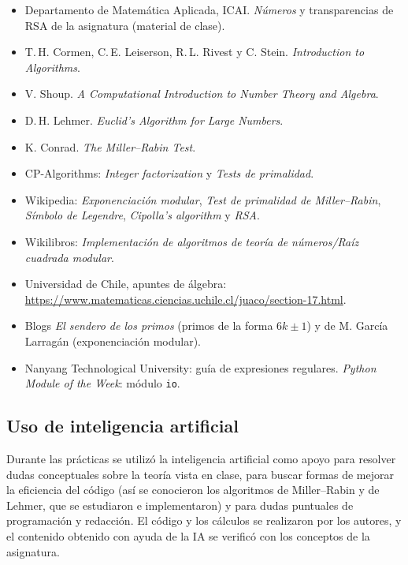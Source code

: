 \documentclass[11pt,a4paper]{article}
\newcommand{\code}[1]{\texttt{#1}}
\begin{document}
\begin{itemize}
\item Departamento de Matemática Aplicada, ICAI. \emph{Números} y transparencias de RSA de la asignatura (material de clase).
\item T.\,H. Cormen, C.\,E. Leiserson, R.\,L. Rivest y C. Stein. \emph{Introduction to Algorithms}.
\item V. Shoup. \emph{A Computational Introduction to Number Theory and Algebra}.
\item D.\,H. Lehmer. \emph{Euclid's Algorithm for Large Numbers}.
\item K. Conrad. \emph{The Miller--Rabin Test}.
\item CP-Algorithms: \emph{Integer factorization} y \emph{Tests de primalidad}.
\item Wikipedia: \emph{Exponenciación modular}, \emph{Test de primalidad de Miller--Rabin}, \emph{Símbolo de Legendre}, \emph{Cipolla's algorithm} y \emph{RSA}.
\item Wikilibros: \emph{Implementación de algoritmos de teoría de números/Raíz cuadrada modular}.
\item Universidad de Chile, apuntes de álgebra: \url{https://www.matematicas.ciencias.uchile.cl/juaco/section-17.html}.
\item Blogs \emph{El sendero de los primos} (primos de la forma $6k\pm1$) y de M. García Larragán (exponenciación modular).
\item Nanyang Technological University: guía de expresiones regulares. \emph{Python Module of the Week}: módulo \code{io}.
\end{itemize}

\subsection*{Uso de inteligencia artificial}

Durante las prácticas se utilizó la inteligencia artificial como apoyo para resolver dudas conceptuales sobre la teoría vista en clase, para buscar formas de mejorar la eficiencia del código (así se conocieron los algoritmos de Miller--Rabin y de Lehmer, que se estudiaron e implementaron) y para dudas puntuales de programación y redacción. El código y los cálculos se realizaron por los autores, y el contenido obtenido con ayuda de la IA se verificó con los conceptos de la asignatura.
\end{document}
